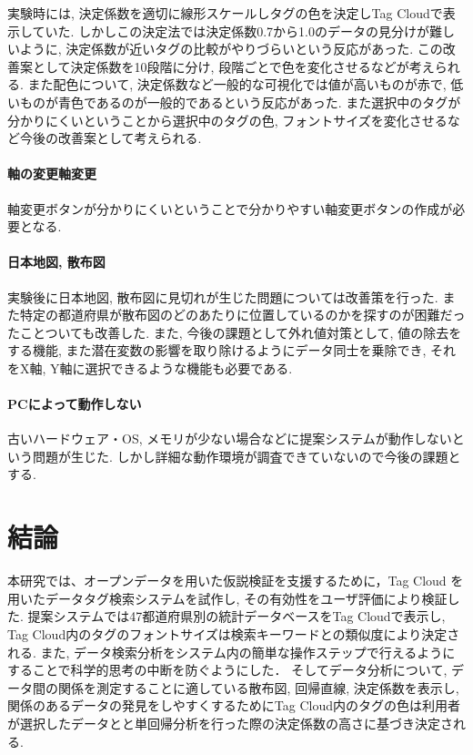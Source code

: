 \documentclass[sotsuron]{kuee}
\begin{document}
実験時には, 決定係数を適切に線形スケールしタグの色を決定しTag Cloudで表示していた.
しかしこの決定法では決定係数0.7から1.0のデータの見分けが難しいように, 決定係数が近いタグの比較がやりづらいという反応があった.
この改善案として決定係数を10段階に分け, 段階ごとで色を変化させるなどが考えられる.
また配色について, 決定係数など一般的な可視化では値が高いものが赤で, 低いものが青色であるのが一般的であるという反応があった.
また選択中のタグが分かりにくいということから選択中のタグの色, フォントサイズを変化させるなど今後の改善案として考えられる.

\subsubsection{軸の変更軸変更}

軸変更ボタンが分かりにくいということで分かりやすい軸変更ボタンの作成が必要となる.

\subsubsection{日本地図, 散布図}

実験後に日本地図, 散布図に見切れが生じた問題については改善策を行った.
また特定の都道府県が散布図のどのあたりに位置しているのかを探すのが困難だったことついても改善した.
また, 今後の課題として外れ値対策として, 値の除去をする機能, また潜在変数の影響を取り除けるようにデータ同士を乗除でき, それをX軸, Y軸に選択できるような機能も必要である.

\subsubsection{PCによって動作しない}

古いハードウェア・OS, メモリが少ない場合などに提案システムが動作しないという問題が生じた.
しかし詳細な動作環境が調査できていないので今後の課題とする.

\chapter{結論}
本研究では、オープンデータを用いた仮説検証を支援するために，Tag Cloud を用いたデータタグ検索システムを試作し, その有効性をユーザ評価により検証した.
提案システムでは47都道府県別の統計データベースをTag Cloudで表示し,
Tag Cloud内のタグのフォントサイズは検索キーワードとの類似度により決定される.
また, データ検索分析をシステム内の簡単な操作ステップで行えるようにすることで科学的思考の中断を防ぐようにした．
そしてデータ分析について, データ間の関係を測定することに適している散布図, 回帰直線, 決定係数を表示し,
関係のあるデータの発見をしやすくするためにTag Cloud内のタグの色は利用者が選択したデータとと単回帰分析を行った際の決定係数の高さに基づき決定される.
\end{document}
